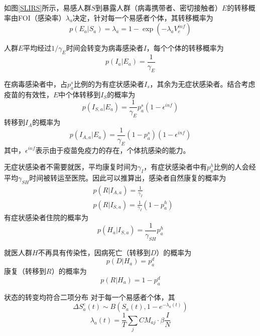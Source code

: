 \documentclass[bwprint]{gmcmthesis}
\numberwithin{figure}{section}
\begin{document}
如图\ref{SLIRS}所示，易感人群$S$到暴露人群（病毒携带者、密切接触者）$E$的转移概率由FOI（感染率）$\lambda_a$决定，针对每一个易感者个体，其转移概率为
\begin{equation}
p(E_a\vert S_a)=\lambda_a=1-\exp(-\lambda_aV_e^{inf}) 
\end{equation}
\par 人群$E$平均经过$1/\gamma_E$时间会转变为病毒感染者$I$，每个个体的转移概率为
\begin{equation}
p(I_a\vert E_a)=\frac{1}{\gamma_E}
\end{equation}
\par 在病毒感染者中，占$p_a^s$比例的为有症状感染者$I_s$，其余为无症状感染者。结合考虑疫苗的有效性，$E$中个体转移到$I_S$的概率为
\begin{equation}
p(I_{S,a}\vert E_a)=\frac{1}{\gamma_E}p_a^s(1-\epsilon^{inf})
\end{equation}
转移到$I_A$的概率为
\begin{equation}
p(I_{A,a}\vert E_a)=\frac{1}{\gamma_E}(1-p_a^s)(1-\epsilon^{inf})
\end{equation}
其中，$\epsilon^{inf}$表示由于疫苗免疫力的存在，个体抗感染的能力。
\par 无症状感染者不需要就医，平均康复时间为$\gamma_I$，有症状感染者中有$p_a^h$比例的人会经平均$\gamma_{SH}$时间被转运至医院。因此可以推算出，感染者自然康复的概率为
\begin{equation}
\begin{aligned}
&p(R\vert I_{A,a})=\frac{1}{\gamma_I}\\
&p(R\vert I_{S,a})=\frac{1}{\gamma_I}(1-p_a^h)
\end{aligned}
\end{equation}
有症状感染者住院的概率为
\begin{equation}
p(H_{a}\vert I_{S,a})=\frac{1}{\gamma_{SH}}p_a^h
\end{equation}
\par 就医人群$H$不再具有传染性，因病死亡（转移到$D$）的概率为
\begin{equation}
p(D\vert H_a)=p_a^d
\end{equation}
康复（转移到$R$）的概率为
\begin{equation}
p(R\vert H_a)=1-p_a^d
\end{equation}
\par 状态的转变均符合二项分布
对于每一个易感者个体，其
\begin{equation}
\Delta S^e_a(t)\sim B(S_a(t),1-e^{-\lambda_a(t)})
\end{equation}
\begin{equation}
\lambda_a(t)=\frac{1}{T}\sum_jCM_{aj}\cdot\beta\frac{I}{N}
\end{equation}
\end{document}
